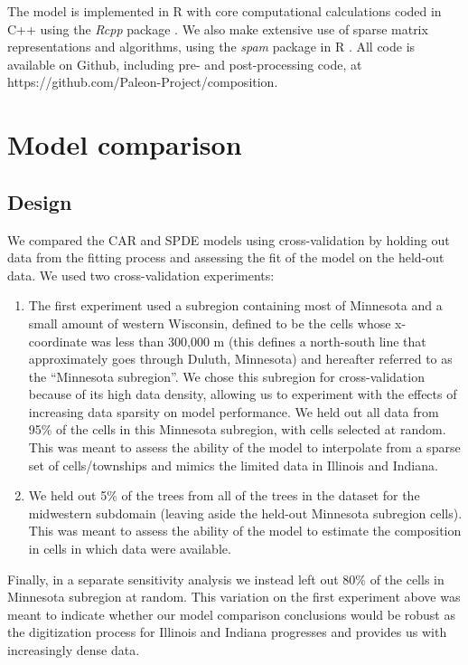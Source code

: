 \documentclass[12pt]{article}
\begin{document}
The model is implemented in R \citep{R:2014} with core computational
calculations coded in C++ using the \emph{Rcpp} package \citep{Edde:Fran:2011}.
We also make extensive use of sparse matrix representations and algorithms,
using the \emph{spam} package in R \citep{Furr:Sain:2010}. All code
is available on Github, including pre- and post-processing code, at
https://github.com/Paleon-Project/composition. 


\section{Model comparison\label{sec:Model-comparison}}


\subsection{Design}

We compared the CAR and SPDE models using cross-validation by holding
out data from the fitting process and assessing the fit of the model
on the held-out data. We used two cross-validation experiments:
\begin{enumerate}
\item The first experiment used a subregion containing most of Minnesota
and a small amount of western Wisconsin, defined to be the cells whose
x-coordinate was less than 300,000 m (this defines a north-south line
that approximately goes through Duluth, Minnesota) and hereafter referred
to as the ``Minnesota subregion''. We chose this subregion for cross-validation
because of its high data density, allowing us to experiment with the
effects of increasing data sparsity on model performance. We held
out all data from 95\% of the cells in this Minnesota subregion, with
cells selected at random. This was meant to assess the ability of
the model to interpolate from a sparse set of cells/townships and
mimics the limited data in Illinois and Indiana.
\item We held out 5\% of the trees from all of the trees in the dataset
for the midwestern subdomain (leaving aside the held-out Minnesota
subregion cells). This was meant to assess the ability of the model
to estimate the composition in cells in which data were available. 
\end{enumerate}
Finally, in a separate sensitivity analysis we instead left out 80\%
of the cells in Minnesota subregion at random. This variation on the
first experiment above was meant to indicate whether our model comparison
conclusions would be robust as the digitization process for Illinois
and Indiana progresses and provides us with increasingly dense data. 
\end{document}
